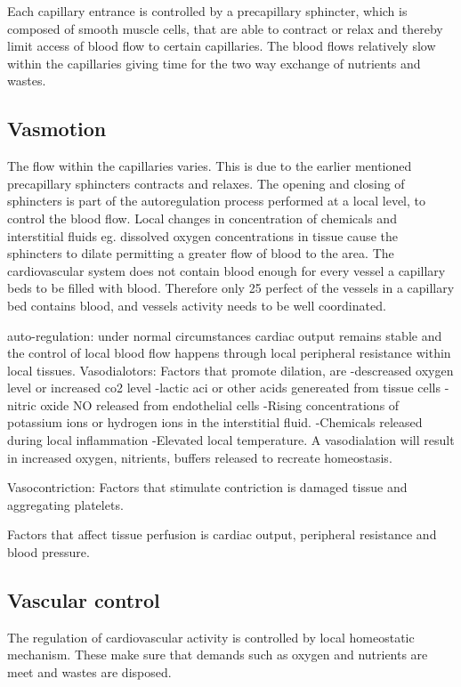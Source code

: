 Each capillary entrance is controlled by a precapillary sphincter, which is composed of smooth muscle cells, that are able to contract or relax and thereby limit access of blood flow to certain capillaries. The blood flows relatively slow within the capillaries giving time for the two way exchange of nutrients and wastes. \cite{martini2012}

\subsection{Vasmotion}

The flow within the capillaries varies. This is due to the earlier mentioned precapillary sphincters contracts and relaxes. The opening and closing of sphincters is part of the autoregulation process performed at a local level, to control the blood flow. Local changes in concentration of chemicals and interstitial fluids eg. dissolved oxygen concentrations in tissue cause the sphincters to dilate permitting a greater flow of blood to the area. The cardiovascular system does not contain blood enough for every vessel a capillary beds to be filled with blood. Therefore only 25 perfect of the vessels in a capillary bed contains blood, and vessels activity needs to be well coordinated.\cite{martini2012}

auto-regulation: under normal circumstances cardiac output remains stable and the control of local blood flow happens through local peripheral resistance within local tissues. 
Vasodialotors: Factors that promote dilation, are 
-descreased oxygen level or increased co2 level
-lactic aci or other acids genereated from tissue cells
-nitric oxide NO released from endothelial cells
-Rising concentrations of potassium ions or hydrogen ions
in the interstitial fluid.
-Chemicals released during local inflammation
-Elevated local temperature.
A vasodialation will result in increased oxygen, nitrients, buffers released to recreate homeostasis. 

Vasocontriction: Factors that stimulate contriction is damaged tissue and aggregating platelets. 


Factors that affect tissue perfusion is cardiac output, peripheral resistance and blood pressure. 

\subsection{Vascular control}

The regulation of cardiovascular activity is controlled by local homeostatic mechanism. These make sure that demands such as oxygen and nutrients are meet and wastes are disposed.  \cite{martini2012} 






